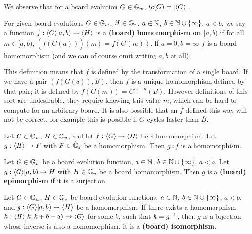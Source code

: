 \documentclass[12pt,letterpaper]{article}
\begin{document}
\begin{prop}\label{timeToCycleIsAllBoards}
  We observe that for a board evolution $G\in \mathbb{G}_w$, $tc(G)=\lvert\langle G\rangle\rvert$.
\end{prop}

\begin{dfn}\label{boardHomo}
  For given board evolutions $G\in \mathbb{G}_w$, $H\in \mathbb{G}_v$, $a\in \mathbb{N}$, $b\in\mathbb{N}\cup\{\infty\}$, $a<b$, we say a function $f:\langle G\rangle[a,b)\rightarrow \langle H\rangle$ is a {\bf (board) homomorphism on $[a,b)$} if for all $m\in [a,b)$, $(\overline{f(G(a))})(m)=f(G(m))$. If $a=0,b=\infty$ $f$ is a board homomorphism (and we can of course omit writing $a,b$ at all). %
\end{dfn}

\begin{remark} This definition means that $f$ is defined by the transformation of a single board. If we have a pair $(f(G(a)), B)$, then $f$ is a unique homomorphism defined by that pair; it is defined by $f(G(m))=C^{m-a}(B)$. However definitions of this sort are undesirable, they require knowing this value $m$, which can be hard to compute for an arbitrary board. It is also possible that an $f$ defined this way will not be correct, for example this is possible if $G$ cycles faster than $\bar{B}$.
\end{remark}

\begin{prop}\label{homoCompose}
  Let $G\in \mathbb{G}_w$, $H\in \mathbb{G}_v$, and let $f:\langle G\rangle\rightarrow \langle H\rangle$ be a homomorphism. Let $g:\langle H\rangle\rightarrow F$ with $F\in\hat{\mathbb{G}}_z$ be a homomorphism. Then $g\circ f$ is a homomorphism.
\end{prop}

\begin{dfn}\label{boardEpi}
  Let $G\in \mathbb{G}_w$ be a board evolution function, $a\in \mathbb{N}$, $b\in\mathbb{N}\cup\{\infty\}$, $a<b$. Let $g:\langle G\rangle[a,b)\rightarrow H$ with $H\in\mathbb{G}_v$ be a board homomorphism. Then $g$ is a {\bf (board) epimorphism} if it is a surjection.
\end{dfn}

\begin{dfn}\label{boardIso}
  Let $G\in \mathbb{G}_w$, $H\in \mathbb{G}_v$ be board evolution functions, $a\in \mathbb{N}$, $b\in\mathbb{N}\cup\{\infty\}$, $a<b$, and $g:\langle G\rangle[a,b)\rightarrow \langle H\rangle$ be a homomorphism.
  If there exists a homomorphism $h:\langle H\rangle[k,k+b-a)\rightarrow \langle G\rangle$ for some $k$, such that $h={g}^{-1}$, then $g$ is a bijection whose inverse is also a homomorphism, it is a {\bf (board) isomorphism.}
\end{dfn}
\end{document}
